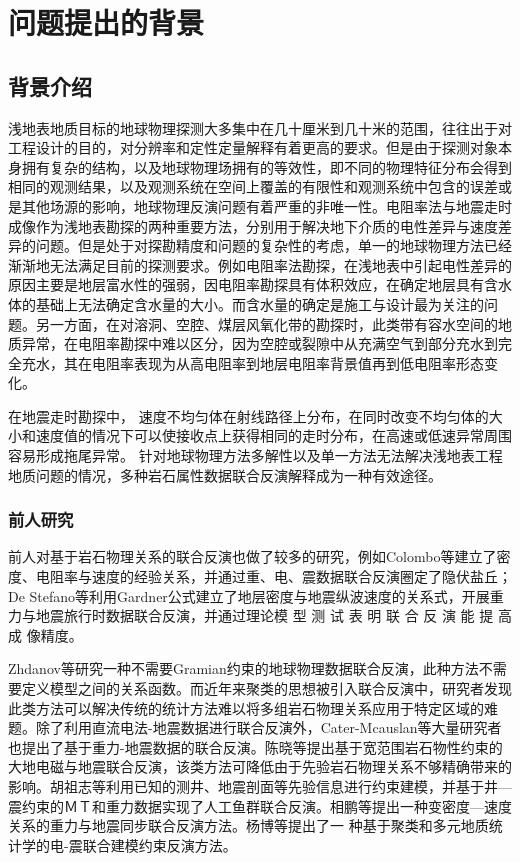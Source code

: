 \section{问题提出的背景}

\subsection{背景介绍}

浅地表地质目标的地球物理探测大多集中在几十厘米到几十米的范围，往往出于对工程设计的目的，对分辨率和定性定量解释有着更高的要求。但是由于探测对象本身拥有复杂的结构，以及地球物理场拥有的等效性，即不同的物理特征分布会得到相同的观测结果，以及观测系统在空间上覆盖的有限性和观测系统中包含的误差或是其他场源的影响，地球物理反演问题有着严重的非唯一性。电阻率法与地震走时成像作为浅地表勘探的两种重要方法，分别用于解决地下介质的电性差异与速度差异的问题。但是处于对探勘精度和问题的复杂性的考虑，单一的地球物理方法已经渐渐地无法满足目前的探测要求。例如电阻率法勘探，在浅地表中引起电性差异的原因主要是地层富水性的强弱，因电阻率勘探具有体积效应，在确定地层具有含水体的基础上无法确定含水量的大小。而含水量的确定是施工与设计最为关注的问题。另一方面，在对溶洞、空腔、煤层风氧化带的勘探时，此类带有容水空间的地质异常，在电阻率勘探中难以区分，因为空腔或裂隙中从充满空气到部分充水到完全充水，其在电阻率表现为从高电阻率到地层电阻率背景值再到低电阻率形态变化。

在地震走时勘探中， 速度不均匀体在射线路径上分布，在同时改变不均匀体的大小和速度值的情况下可以使接收点上获得相同的走时分布，在高速或低速异常周围容易形成拖尾异常。 针对地球物理方法多解性以及单一方法无法解决浅地表工程地质问题的情况，多种岩石属性数据联合反演解释成为一种有效途径。

\subsubsection{前人研究}

前人对基于岩石物理关系的联合反演也做了较多的研究，例如Colombo等建立了密度、电阻率与速度的经验关系，并通过重、电、震数据联合反演圈定了隐伏盐丘；De Stefano等利用Gardner公式建立了地层密度与地震纵波速度的关系式，开展重力与地震旅行时数据联合反演，并通过理论模 型 测 试 表 明 联 合 反 演 能 提 高 成 像精度。

Zhdanov等研究一种不需要Gramian约束的地球物理数据联合反演，此种方法不需要定义模型之间的关系函数。而近年来聚类的思想被引入联合反演中，研究者发现此类方法可以解决传统的统计方法难以将多组岩石物理关系应用于特定区域的难题。除了利用直流电法-地震数据进行联合反演外，Cater-Mcauslan等大量研究者也提出了基于重力-地震数据的联合反演。陈晓等提出基于宽范围岩石物性约束的大地电磁与地震联合反演，该类方法可降低由于先验岩石物理关系不够精确带来的影响。胡祖志等利用已知的测井、地震剖面等先验信息进行约束建模，并基于井—震约束的ＭＴ和重力数据实现了人工鱼群联合反演。相鹏等提出一种变密度—速度关系的重力与地震同步联合反演方法。杨博等提出了一 种基于聚类和多元地质统计学的电-震联合建模约束反演方法。


